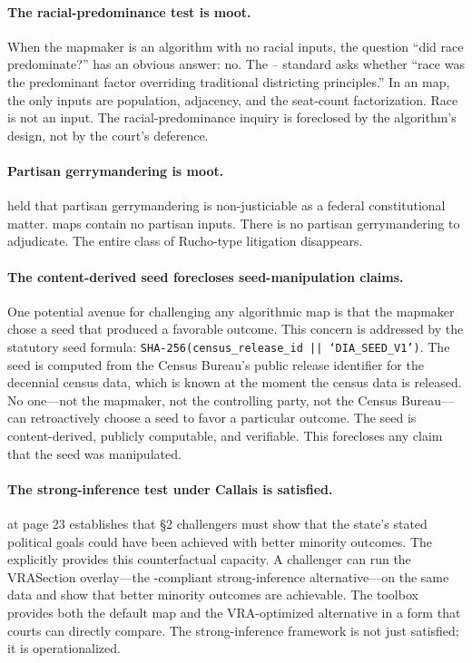 \paragraph{The racial-predominance test is moot.}
When the mapmaker is an algorithm with no racial inputs, the question
``did race predominate?'' has an obvious answer: no.
The \shaw{}--\miller{} standard asks whether ``race was the predominant factor
overriding traditional districting principles.''
In an \ar{} map, the only inputs are population, adjacency, and the seat-count
factorization.
Race is not an input.
The racial-predominance inquiry is foreclosed by the algorithm's design,
not by the court's deference.

\paragraph{Partisan gerrymandering is moot.}
\rucho{} held that partisan gerrymandering is non-justiciable as a federal
constitutional matter.
\ar{} maps contain no partisan inputs.
There is no partisan gerrymandering to adjudicate.
The entire class of Rucho-type litigation disappears.

\paragraph{The content-derived seed forecloses seed-manipulation claims.}
One potential avenue for challenging any algorithmic map is that the
mapmaker chose a seed that produced a favorable outcome.
This concern is addressed by the statutory seed formula:
\texttt{SHA-256(census\_release\_id || `DIA\_SEED\_V1')}.
The seed is computed from the Census Bureau's public release identifier
for the decennial census data, which is known at the moment the census
data is released.
No one---not the mapmaker, not the controlling party, not the Census Bureau---
can retroactively choose a seed to favor a particular outcome.
The seed is content-derived, publicly computable, and verifiable.
This forecloses any claim that the seed was manipulated.

\paragraph{The strong-inference test under Callais is satisfied.}
\callais{} at page 23 establishes that \S2 challengers must show that the
state's stated political goals could have been achieved with better minority
outcomes.
The \dia{} explicitly provides this counterfactual capacity.
A challenger can run the VRASection overlay---the \callais{}-compliant
strong-inference alternative---on the same data and show that better minority
outcomes are achievable.
The toolbox provides both the default map and the VRA-optimized alternative
in a form that courts can directly compare.
The \callais{} strong-inference framework is not just satisfied; it is operationalized.
